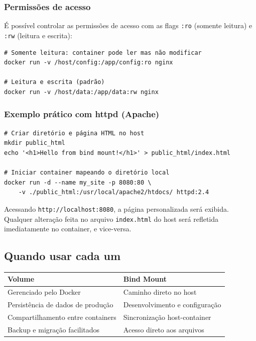 \subsubsection{Permissões de acesso}

É possível controlar as permissões de acesso com as flags \texttt{:ro} (somente leitura) e \texttt{:rw} (leitura e escrita):

\begin{verbatim}
# Somente leitura: container pode ler mas não modificar
docker run -v /host/config:/app/config:ro nginx

# Leitura e escrita (padrão)
docker run -v /host/data:/app/data:rw nginx
\end{verbatim}

\subsubsection{Exemplo prático com httpd (Apache)}

\begin{verbatim}
# Criar diretório e página HTML no host
mkdir public_html
echo '<h1>Hello from bind mount!</h1>' > public_html/index.html

# Iniciar container mapeando o diretório local
docker run -d --name my_site -p 8080:80 \
    -v ./public_html:/usr/local/apache2/htdocs/ httpd:2.4
\end{verbatim}

Acessando \texttt{http://localhost:8080}, a página personalizada será exibida. Qualquer alteração feita no arquivo \texttt{index.html} do host será refletida imediatamente no container, e vice-versa.

\subsection{Quando usar cada um}

\begin{center}
\begin{tabular}{|l|l|}
\hline
\textbf{Volume} & \textbf{Bind Mount} \\
\hline
Gerenciado pelo Docker & Caminho direto no host \\
Persistência de dados de produção & Desenvolvimento e configuração \\
Compartilhamento entre containers & Sincronização host-container \\
Backup e migração facilitados & Acesso direto aos arquivos \\
\hline
\end{tabular}
\end{center}
